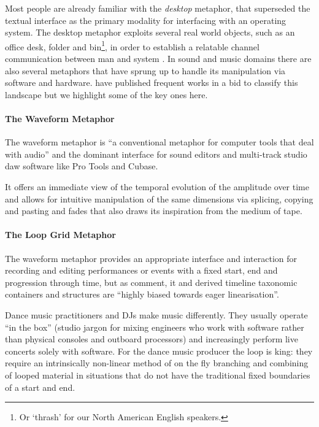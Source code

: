 Most people are already familiar with the \textit{desktop} metaphor, that superseded the textual interface as the primary modality for interfacing with an operating system. The desktop metaphor exploits several real world objects, such as an office desk, folder and bin\footnote{Or `thrash' for our North American English speakers.}, in order to establish a relatable channel communication between man and system \citep{Helander2014}. In sound and music domains there are also several metaphors that have sprung up to handle its manipulation via software and hardware. \cite{Duignan2010} have published frequent works in a bid to classify this landscape but we highlight some of the key ones here.

\paragraph{The Waveform Metaphor}

The waveform metaphor is ``a conventional metaphor for computer tools that deal with audio'' \citep{Duignan2004} and the dominant interface for sound editors and multi-track studio \acrshort{daw} software like Pro Tools and Cubase.

It offers an immediate view of the temporal evolution of the amplitude over time and allows for intuitive manipulation of the same dimensions via splicing, copying and pasting and fades that also draws its inspiration from the medium of tape. 

\paragraph{The Loop Grid Metaphor}

The waveform metaphor provides an appropriate interface and interaction for recording and editing performances or events with a fixed start, end and progression through time, but as  \citep{Duignan2005} comment, it and derived timeline taxonomic containers and structures are ``highly biased towards eager linearisation''.

Dance music practitioners and DJs make music differently. They usually operate ``in the box'' (studio jargon for mixing engineers who work with software rather than physical consoles and outboard processors) and increasingly perform live concerts solely with software. For the dance music producer the loop is king: they require an intrinsically non-linear method of on the fly branching and combining of looped material in situations that do not have the traditional fixed boundaries of a start and end. 

